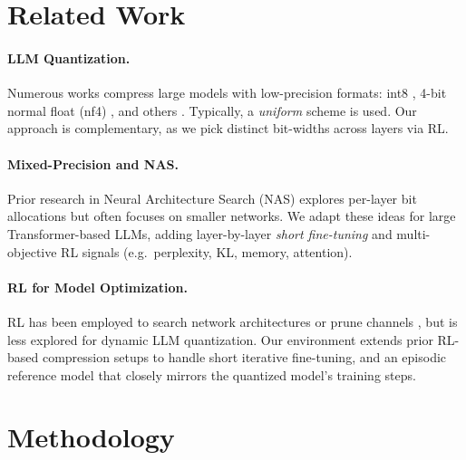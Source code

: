 \documentclass{article}
\begin{document}
	\section{Related Work}
	\label{sec:related}
	\paragraph{LLM Quantization.}
	Numerous works compress large models with low-precision formats: int8 \cite{dettmers2022llmint8}, 4-bit normal float (nf4) \cite{frantar2022gptq}, and others \cite{malinovskii2024pvtuning}. Typically, a \emph{uniform} scheme is used. Our approach is complementary, as we pick distinct bit-widths across layers via RL.
	
	\paragraph{Mixed-Precision and NAS.}
	Prior research in Neural Architecture Search (NAS) explores per-layer bit allocations \cite{dong2019hawq,Wang2020apq} but often focuses on smaller networks. We adapt these ideas for large Transformer-based LLMs, adding layer-by-layer \emph{short fine-tuning} and multi-objective RL signals (e.g.\ perplexity, KL, memory, attention).
	
	\paragraph{RL for Model Optimization.}
	RL has been employed to search network architectures \cite{zoph2016neural} or prune channels \cite{he2018amc}, but is less explored for dynamic LLM quantization. Our environment extends prior RL-based compression setups to handle short iterative fine-tuning, and an episodic reference model that closely mirrors the quantized model’s training steps.
	
	\section{Methodology}
	\label{sec:method}
	
\end{document}
